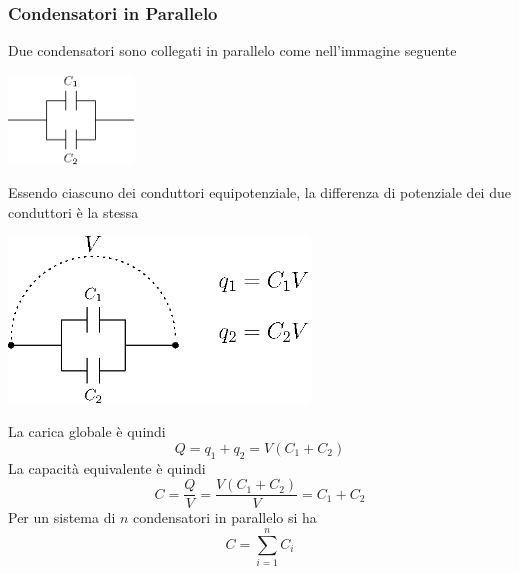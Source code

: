 \documentclass[10pt, letterpaper]{report}
\begin{document}
\subsubsection{Condensatori in Parallelo}
Due condensatori sono collegati in parallelo come nell'immagine seguente\begin{center}
    \includegraphics[width=0.25\textwidth]{images/condParallelo.eps}
\end{center} 
Essendo ciascuno dei conduttori equipotenziale, la differenza di potenziale dei due conduttori è la stessa\begin{center}
    \includegraphics[width=0.6\textwidth]{images/condParallelo2.eps}
\end{center} 
La carica globale è quindi 
$$ Q=q_1+q_2=V(C_1+C_2)$$
La capacità equivalente è quindi 
$$ C=\frac{Q}{V}=\frac{V(C_1+C_2)}{V}=C_1+C_2$$
Per un sistema di $n$ condensatori in parallelo si ha 
$$ C=\sum_{i=1}^nC_i$$
\end{document}

